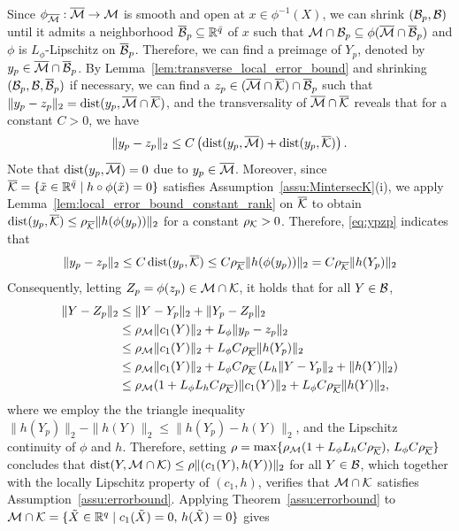 Since $\phi_{\overline{\mathcal{M}}}:\overline{\mathcal{M}}\to\mathcal{M}$ is smooth and open at $x\in\phi^{-1}(X)$, we can shrink $(\mathcal{B}_p,\mathcal{B})$ until it admits a neighborhood $\overline{\mathcal{B}}_p\subseteq\mathbb{R}^{\bar{q}}$ of $x$ such that $\mathcal{M}\cap\mathcal{B}_p\subseteq \phi(\overline{\mathcal{M}}\cap\overline{\mathcal{B}}_p)$ and $\phi$ is $L_\phi$-Lipschitz on $\overline{\mathcal{B}}_p$. Therefore, we can find a preimage of $Y_p$, denoted by $y_p\in\overline{\mathcal{M}}\cap\overline{\mathcal{B}}_p$. By Lemma~\ref{lem:transverse_local_error_bound} and shrinking $(\mathcal{B}_p,\mathcal{B},\overline{\mathcal{B}}_p)$ if necessary, we can find a $z_p\in(\overline{\mathcal{M}}\cap\overline{\mathcal{K}})\cap\overline{\mathcal{B}}_p$ such that $\|y_p-z_p\|_2=\operatorname{dist}(y_p,\overline{\mathcal{M}}\cap\overline{\mathcal{K}})$, and the transversality of $\overline{\mathcal{M}}\cap\overline{\mathcal{K}}$ reveals that for a constant $C>0$, we have
\begin{equation}\label{eq:ypzp}
\|y_p-z_p\|_2\le C\left( {\operatorname{dist}(y_p,\overline{\mathcal{M}})+\operatorname{dist}(y_p,\overline{\mathcal{K}})} \right).    
\end{equation}
Note that $\operatorname{dist}(y_p,\overline{\mathcal{M}})=0$ due to $y_p\in\overline{\mathcal{M}}$. Moreover, since $\overline{\mathcal{K}}=\{\tilde{x}\in\mathbb{R}^{\bar{q}}\mid h\circ\phi (\tilde{x})=0\}$ satisfies Assumption~\ref{assu:MintersecK}(i), we apply Lemma~\ref{lem:local_error_bound_constant_rank} on $\overline{\mathcal{K}}$ to obtain $\operatorname{dist}(y_p,\overline{\mathcal{K}})\le \rho_{\overline{\mathcal{K}}}\|h(\phi(y_p))\|_2$ for a constant $\rho_{\mathcal{K}}>0$. Therefore, \eqref{eq:ypzp} indicates that
\begin{equation}
    \|y_p-z_p\|_2\le C\operatorname{dist}(y_p,\overline{\mathcal{K}})\le C\rho_{\overline{\mathcal{K}}}\|h(\phi(y_p))\|_2 = C\rho_{\overline{\mathcal{K}}}\|h(Y_p)\|_2
\end{equation}
Consequently, letting $Z_p=\phi(z_p)\in\mathcal{M}\cap\mathcal{K}$, it holds that for all $Y\in\mathcal{B}$,
\begin{equation*}
\begin{aligned}
    \|Y-Z_p\|_2 &\le \|Y-Y_p\|_2 + \|Y_p-Z_p\|_2 
    \\
    &\le \rho_{\mathcal{M}}\|c_1(Y)\|_2 + L_{\phi}\|y_p-z_p\|_2   
    \\
    &\le \rho_{\mathcal{M}}\|c_1(Y)\|_2 + L_{\phi}C\rho_{\overline{\mathcal{K}}}\|h(Y_p)\|_2
    \\
    &\le \rho_{\mathcal{M}}\|c_1(Y)\|_2 + L_{\phi}C\rho_{\overline{\mathcal{K}}} \left( {L_h\|Y-Y_p\|_2 + \|h(Y)\|_2} \right)
    \\
    &\le \rho_{\mathcal{M}}(1+L_{\phi}L_hC\rho_{\overline{\mathcal{K}}} )\|c_1(Y)\|_2 + L_{\phi}C\rho_{\overline{\mathcal{K}}} \|h(Y)\|_2,
\end{aligned}
\end{equation*}
where we employ the the triangle inequality $\|h(Y_p)\|_2 - \|h(Y)\|_2\le \|h(Y_p)-h(Y)\|_2$, and the Lipschitz continuity of $\phi$ and $h$. Therefore, setting $\rho=\max\{\rho_{\mathcal{M}}(1+L_{\phi}L_hC\rho_{\overline{\mathcal{K}}} ),\,L_{\phi}C\rho_{\overline{\mathcal{K}}} \}$ concludes that $\operatorname{dist}(Y,\mathcal{M}\cap\mathcal{K})\le \rho\|(c_1(Y),h(Y))\|_2$ for all $Y\in\mathcal{B}$, which together with the locally Lipschitz property of $(c_1,h)$, verifies that $\mathcal{M}\cap\mathcal{K}$ satisfies Assumption~\ref{assu:errorbound}. Applying Theorem~\ref{assu:errorbound} to $\mathcal{M}\cap\mathcal{K}=\{\tilde{X}\in\mathbb{R}^q\mid c_1(\tilde{X})=0,\,h(\tilde{X})=0\}$ gives

